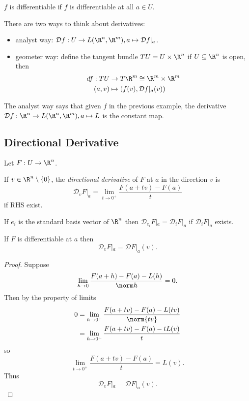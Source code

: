 \documentclass[a4paper]{article}
\newcommand*{\D}{\mathcal{D}}
\theoremstyle{definition}
\begin{document}
\begin{definition}[Differentiability]
  \(f\) is differentiable if \(f\) is differentiable at all \(a \in U\).
\end{definition}

There are two ways to think about derivatives:
\begin{itemize}
\item analyst way: \(\D f: U \to L(\R^n, \R^m), a \mapsto \D f|_a\). 
\item geometer way: define the tangent bundle \(TU = U \times \R^n\) if \(U \subseteq \R^n\) is open, then
  \begin{align*}
    df: TU &\to T\R^m \cong \R^m \times \R^m \\
    (a, v) &\mapsto (f(v), \D f|_a(v))
  \end{align*}
\end{itemize}

The analyst way says that given \(f\) in the previous example, the derivative \(\D f: \R^n \to L(\R^n, \R^m), a \mapsto L\) is the constant map.

\subsection{Directional Derivative}

Let \(F: U \to \R^n\).

\begin{definition}
  If \(v \in \R^n\setminus \{0\}\), the \emph{directional derivative} of \(F\) at \(a\) in the direction \(v\) is
  \[
    \D_v F|_a = \lim_{t \to 0^+} \frac{F(a + tv) - F(a)}{t}
  \]
  if RHS exist.
\end{definition}

\begin{eg}
  If \(e_i\) is the standard basis vector of \(\R^n\) then \(\D_{e_i} F|_a = \D_i F|_a\) if \(\D_i F|_a\) exists.
\end{eg}

\begin{proposition}
  If \(F\) is differentiable at \(a\) then
  \[
    \D_v F|_a = \D F|_a (v).
  \]
\end{proposition}

\begin{proof}
  Suppose
  \[
    \lim_{h \to 0} \frac{F(a + h) - F(a) - L(h)}{\norm h} = 0.
  \]
  Then by the property of limits
  \begin{align*}
    0 &= \lim_{h \to 0^+} \frac{F(a + tv) - F(a) - L(tv)}{\norm{tv}} \\
      &= \lim_{h \to 0^+} \frac{F(a + tv) - F(a) - t L(v)}{t}
  \end{align*}
  so
  \[
    \lim_{t \to 0^+} \frac{F(a + tv) - F(a)}{t} = L(v).
  \]
  Thus
  \[
    \D_v F|_a = \D F|_a(v).
  \]
\end{proof}
\end{document}
